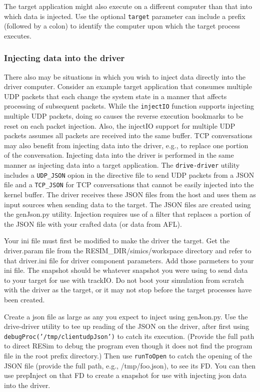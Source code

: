 \documentclass[titlepage]{article}
\begin{document}
The target application might also execute on a different computer than that into which data is injected.  Use the optional {\tt target} parameter
can include a prefix (followed by a colon) to identify the computer upon which the target process executes.

\subsubsection{Injecting data into the driver}
There also may be situations in which you wish to inject data directly into the driver computer.  Consider an example target application that consumes
multiple UDP packets that each change the system state in a manner that affects processing of subsequent packets.  While the {\tt injectIO} function
supports injecting multiple UDP packets, doing so causes the reverse execution bookmarks to be reset on each packet injection.  Also, the injectIO
support for multiple UDP packets assumes all packets are received into the same buffer.  TCP conversations may also benefit from injecting data into the
driver, e.g., to replace one portion of the conversation.  Injecting data into the driver is performed in the same
manner as injecting data into a target application.  The {\tt drive-driver} utility includes a {\tt UDP\_JSON} opion in the directive file to send UDP packets from a
JSON file and a {\tt TCP\_JSON} for TCP conversations that cannot be easily injected into the kernel buffer. The driver receives these JSON files from the 
host and uses them as input sources when sending data to the target. 
The JSON files are created using the genJson.py utility.  Injection requires use of a filter that replaces a portion of the JSON file with your crafted data (or data from AFL).

Your ini file must first be modified to make the driver the target.  Get the driver.param file from the RESIM\_DIR/simics/workspace directory and
refer to that driver.ini file for driver component parameters.  Add those parmeters to your ini file.   The snapshot should be whatever snapshot you were using to send
data to your target for use with trackIO.
Do not boot your simulation from scratch with the driver as the target, or it may not stop before the target processes have been created.

Create a json file as large as any you expect to inject using genJson.py.
Use the drive-driver utility to tee up reading of the JSON on the driver, after first using {\tt debugProc('/tmp/clientudpJson')} to catch its execution. (Provide the full path
to direct RESim to debug the program even though it does not find the program file in the root prefix directory.)
Then use {\tt runToOpen} to catch the opening of the JSON file (provide the full path, e.g., /tmp/foo.json), to see its FD.  You can then use prepInject on that FD
to create a snapshot for use with injecting json data into the driver.  
\end{document}
